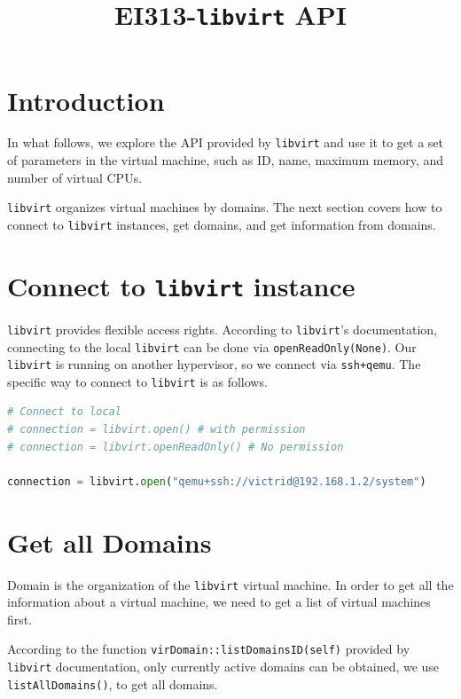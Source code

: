 \documentclass[12pt]{article}
\title{EI313-\texttt{libvirt} API}
\begin{document}
\maketitle

\section{Introduction}

In what follows, we explore the API provided by \texttt{libvirt} and use it to get a set of parameters in the virtual machine, such as ID, name, maximum memory, and number of virtual CPUs.

\texttt{libvirt} organizes virtual machines by domains. The next section covers how to connect to \texttt{libvirt} instances, get domains, and get information from domains.

\section{Connect to \texttt{libvirt} instance}

\texttt{libvirt} provides flexible access rights. According to \texttt{libvirt}'s documentation, connecting to the local \texttt{libvirt} can be done via \texttt{openReadOnly(None)}. Our \texttt{libvirt} is running on another hypervisor, so we connect via \texttt{ssh+qemu}. The specific way to connect to \texttt{libvirt} is as follows.

\begin{lstlisting}[language=python]
# Connect to local
# connection = libvirt.open() # with permission
# connection = libvirt.openReadOnly() # No permission

connection = libvirt.open("qemu+ssh://victrid@192.168.1.2/system")
\end{lstlisting}

\section{Get all Domains}

Domain is the organization of the \texttt{libvirt} virtual machine. In order to get all the information about a virtual machine, we need to get a list of virtual machines first.

According to the function \texttt{virDomain::listDomainsID(self)} provided by \texttt{libvirt} documentation, only currently active domains can be obtained, we use \texttt{listAllDomains()}, to get all domains.
\end{document}
